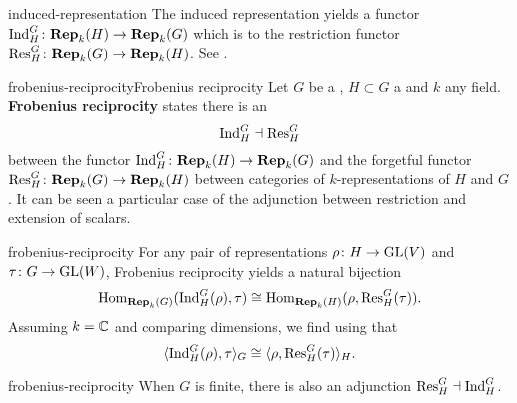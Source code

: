 \begin{example}{induced-representation}
    The induced representation yields a functor $\textup{Ind}_H^G \colon \textbf{Rep}_k(H) \to \textbf{Rep}_k(G)$ which is  to the restriction functor $\textup{Res}_H^G \colon \textbf{Rep}_k(G) \to \textbf{Rep}_k(H)$. See .
\end{example}

\begin{topic}{frobenius-reciprocity}{Frobenius reciprocity}
    Let $G$ be a , $H \subset G$ a  and $k$ any field. \textbf{Frobenius reciprocity} states there is an 
    \[ \textup{Ind}_H^G \dashv \textup{Res}_H^G \]
    between the  functor $\textup{Ind}_H^G \colon \textbf{Rep}_k(H) \to \textbf{Rep}_k(G)$ and the forgetful functor $\textup{Res}_H^G \colon \textbf{Rep}_k(G) \to \textbf{Rep}_k(H)$ between categories of $k$-representations of $H$ and $G$. It can be seen a particular case of the adjunction between restriction and extension of scalars.
\end{topic}

\begin{example}{frobenius-reciprocity}
    For any pair of representations $\rho \colon H \to \textup{GL}(V)$ and $\tau \colon G \to \textup{GL}(W)$, Frobenius reciprocity yields a natural bijection
    \[ \operatorname{Hom}_{\textbf{Rep}_k(G)}(\textup{Ind}_H^G(\rho), \tau) \cong \operatorname{Hom}_{\textbf{Rep}_k(H)}(\rho, \textup{Res}_H^G(\tau)) . \]
    Assuming $k = \mathbb{C}$ and comparing dimensions, we find using  that
    \[ \langle \textup{Ind}_H^G(\rho), \tau \rangle_G \cong \langle \rho, \textup{Res}_H^G(\tau) \rangle_H . \]
\end{example}

\begin{example}{frobenius-reciprocity}
    When $G$ is finite, there is also an adjunction $\textup{Res}_H^G \dashv \textup{Ind}_H^G$.
\end{example}

